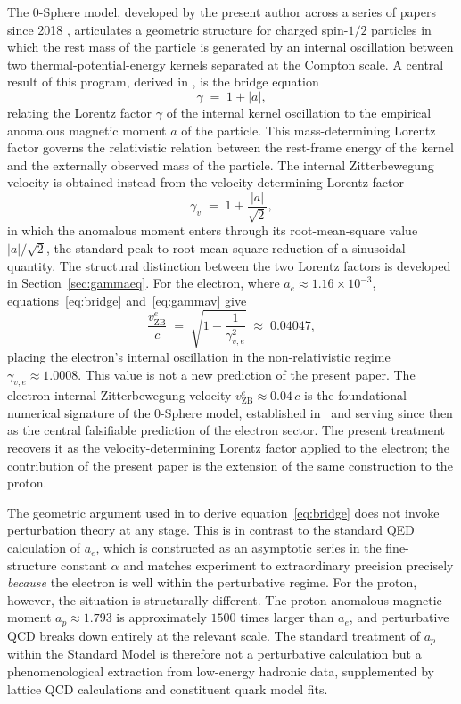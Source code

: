 \documentclass[%
 reprint, amsmath,amssymb, aps, prc, ]{revtex4-2}
\numberwithin{equation}{section}
\newcommand{\vZB}{v_{\text{ZB}}}
\begin{document}
The 0-Sphere model, developed by the present author across a series of papers since 2018 \cite{Hanamura1}, articulates a geometric structure for charged spin-$1/2$ particles in which the rest mass of the particle is generated by an internal oscillation between two thermal-potential-energy kernels separated at the Compton scale.
A central result of this program, derived in \cite{Hanamura10}, is the bridge equation
\begin{equation}
\gamma \;=\; 1 + |a|,
\label{eq:bridge}
\end{equation}
relating the Lorentz factor $\gamma$ of the internal kernel oscillation to the empirical anomalous magnetic moment $a$ of the particle.
This mass-determining Lorentz factor governs the relativistic relation between the rest-frame energy of the kernel and the externally observed mass of the particle.
The internal Zitterbewegung velocity is obtained instead from the velocity-determining Lorentz factor
\begin{equation}
\gamma_v \;=\; 1 + \frac{|a|}{\sqrt{2}},
\label{eq:gammav}
\end{equation}
in which the anomalous moment enters through its root-mean-square value $|a|/\sqrt{2}$, the standard peak-to-root-mean-square reduction of a sinusoidal quantity.
The structural distinction between the two Lorentz factors is developed in Section~\ref{sec:gammaeq}.
For the electron, where $a_e \approx 1.16 \times 10^{-3}$, equations~\eqref{eq:bridge} and~\eqref{eq:gammav} give
\begin{equation}
\frac{\vZB^e}{c} \;=\; \sqrt{1 - \frac{1}{\gamma_{v,e}^{2}}} \;\approx\; 0.04047,
\label{eq:vZBe}
\end{equation}
placing the electron's internal oscillation in the non-relativistic regime $\gamma_{v,e} \approx 1.0008$.
This value is not a new prediction of the present paper. The electron internal Zitterbewegung velocity $\vZB^e \approx 0.04\,c$ is the foundational numerical signature of the 0-Sphere model, established in~\cite{Hanamura10} and serving since then as the central falsifiable prediction of the electron sector. The present treatment recovers it as the velocity-determining Lorentz factor applied to the electron; the contribution of the present paper is the extension of the same construction to the proton.

The geometric argument used in \cite{Hanamura10} to derive equation~\eqref{eq:bridge} does not invoke perturbation theory at any stage.
This is in contrast to the standard QED calculation of $a_e$, which is constructed as an asymptotic series in the fine-structure constant $\alpha$ and matches experiment to extraordinary precision precisely \emph{because} the electron is well within the perturbative regime.
For the proton, however, the situation is structurally different.
The proton anomalous magnetic moment $a_p \approx 1.793$ is approximately $1500$ times larger than $a_e$, and perturbative QCD breaks down entirely at the relevant scale.
The standard treatment of $a_p$ within the Standard Model is therefore not a perturbative calculation but a phenomenological extraction from low-energy hadronic data, supplemented by lattice QCD calculations and constituent quark model fits.
\end{document}

